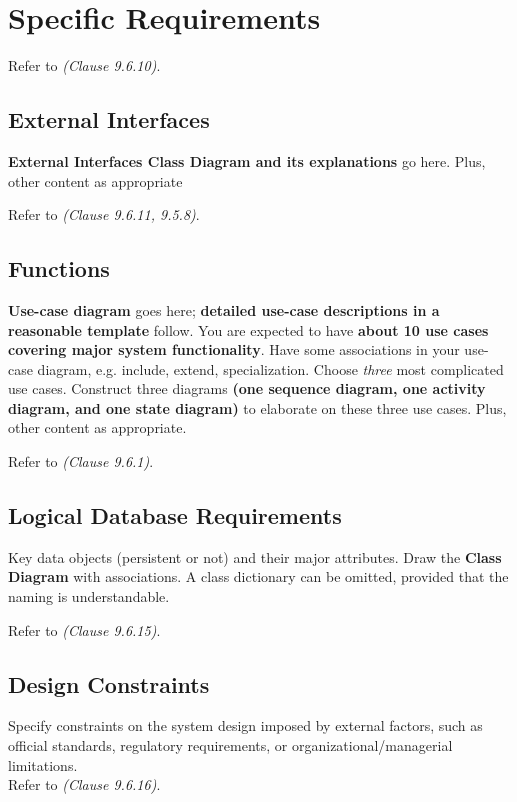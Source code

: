 \chapter{Specific Requirements} \label{specificRequirements}

Refer to \textit{(Clause 9.6.10)}. 

\section{External Interfaces}

\textbf{External Interfaces Class Diagram and its explanations} go here. Plus, other content as appropriate

Refer to \textit{(Clause 9.6.11, 9.5.8)}. 

\section{Functions}

\textbf{Use-case diagram} goes here; \textbf{detailed use-case descriptions in a reasonable template} follow. You are expected to have \textbf{about 10 use cases covering major system functionality}. Have some associations in your use-case diagram, e.g. include, extend, specialization. Choose \textit{three} most complicated use cases. Construct three diagrams \textbf{(one sequence diagram, one activity diagram, and one state diagram)} to elaborate on these three use cases. Plus, other content as appropriate.

Refer to \textit{(Clause 9.6.1)}. 

\section{Logical Database Requirements }
Key data objects (persistent or not) and their major attributes. Draw the \textbf{Class Diagram} with associations. A class dictionary can be omitted, provided that the naming is understandable.

Refer to \textit{(Clause 9.6.15)}.

\section{Design Constraints}
Specify constraints on the system design imposed by external factors, such as official standards, regulatory requirements, or organizational/managerial limitations.\\ Refer to \textit{(Clause 9.6.16)}.

